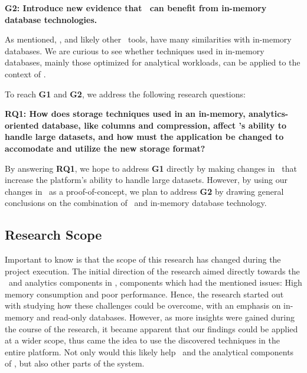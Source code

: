 \setlength{\leftskip}{1cm}

\textbf{G2: Introduce new evidence that \mde~can benefit from in-memory database technologies.}

\setlength{\leftskip}{0pt}

As mentioned, \gap, and likely other \mde~tools, have many similarities with in-memory databases. We are curious to see whether techniques used in in-memory databases, mainly those optimized for analytical workloads, can be applied to the context of \mde. 

To reach \textbf{G1} and \textbf{G2}, we address the following research questions:

\setlength{\leftskip}{1cm}

\textbf{RQ1: How does storage techniques used in an in-memory, analytics-oriented database, like columns and compression, affect \gap's ability to handle large datasets, and how must the application be changed to accomodate and utilize the new storage format?} 

\setlength{\leftskip}{0pt}

By answering \textbf{RQ1}, we hope to address \textbf{G1} directly by making changes in \gap~that increase the platform's ability to handle large datasets. However, by using our changes in \gap~as a proof-of-concept, we plan to address \textbf{G2} by drawing general conclusions on the combination of \mde~and in-memory database technology.

\subsection{Research Scope}
\label{sub:Research Scope}
Important to know is that the scope of this research has changed during the project execution. The initial direction of the research aimed directly towards the \bi~and analytics components in \gap, components which had the mentioned issues: High memory consumption and poor performance. Hence, the research started out with studying how these challenges could be overcome, with an emphasis on in-memory and read-only databases. However, as more insights were gained during the course of the research, it became apparent that our findings could be applied at a wider scope, thus came the idea to use the discovered techniques in the entire platform. Not only would this likely help \bi~and the analytical components of \gap, but also other parts of the system.

